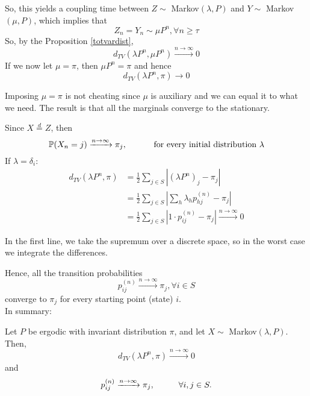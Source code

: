 \documentclass{article}
\begin{document}
	So, this yields a coupling time between $Z \sim$ Markov$(\lambda, P)$ and $Y \sim$ Markov $(\mu, P)$, which implies that 
	\begin{equation*}
		Z_n = Y_n \sim \mu P^n, \forall n \geq \tau
	\end{equation*}
	So, by the Proposition \ref{totvardist}, 
	\begin{equation*}
		d_{TV}(\lambda P^n, \mu P^n) \xrightarrow{n \rightarrow \infty} 0
	\end{equation*}
	If we now let $\mu = \pi$, then $\mu P^n = \pi$ and hence 
	\begin{equation*}
		d_{TV}(\lambda P^n, \pi) \rightarrow 0
	\end{equation*}
	\begin{remark}
		Imposing $\mu = \pi$ is not cheating since $\mu$ is auxiliary and we can equal it to what we need. The result is that all the marginals converge to the stationary. 
	\end{remark}
	Since $X \stackrel{d} = Z$, then
	\begin{equation*}
		\mathbb{P}(X_n = j) \xrightarrow{n \rightarrow \infty} \pi_j, \hspace{1 cm} \text{ for every initial distribution } \lambda
	\end{equation*}
	If $\lambda = \delta_i$:
	\begin{align*}
		d_{TV}(\lambda P^n, \pi) &= \frac{1}{2} \sum_{j \in S} |(\lambda P^n)_j - \pi_j| \\
		&= \frac{1}{2} \sum_{j \in S} |\sum_h \lambda_h p_{hj}^{(n)} - \pi_j| \\
		&= \frac{1}{2} \sum_{j \in S} |1 \cdot p_{ij}^{(n)}-\pi_j| \xrightarrow{n \rightarrow \infty} 0
	\end{align*}
	\begin{remark}
		In the first line, we take the supremum over a discrete space, so in the worst case we integrate the differences. 
	\end{remark}
	Hence, all the transition probabilities 
	\begin{equation*}
		p_{ij}^{(n)} \xrightarrow{n \rightarrow \infty} \pi_j, \forall i \in S
	\end{equation*}
	converge to $\pi_j$ for every starting point (state) $i$.\\
	In summary:
	\begin{theorem}
		\label{th erg}
		Let $P$ be ergodic with invariant distribution $\pi$, and let $X \sim$ Markov$(\lambda, P)$. Then,
		\begin{equation*}
			d_{TV}(\lambda P^n, \pi) \xrightarrow{n \rightarrow \infty} 0
		\end{equation*}
		and
		\begin{equation*}
			p_{ij}^{(n)} \xrightarrow{n \rightarrow \infty} \pi_j, \hspace{1 cm} \forall i,j \in S. 
		\end{equation*}
	\end{theorem}
\end{document}
